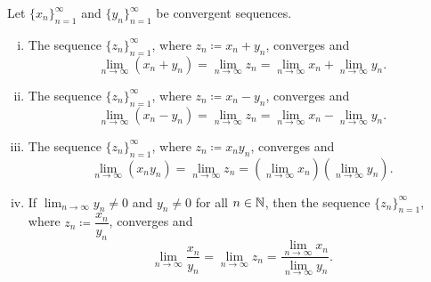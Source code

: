 \begin{prop} \label{prop:contalg}
Let $\{ x_n \}_{n=1}^\infty$ and $\{ y_n \}_{n=1}^\infty$ be convergent sequences.
\begin{enumerate}[(i)]
\item \label{prop:contalg:i}
The sequence $\{ z_n \}_{n=1}^\infty$, where $z_n \coloneqq x_n + y_n$, converges and
\begin{equation*}
\lim_{n \to \infty} (x_n + y_n) = 
\lim_{n \to \infty} z_n = 
\lim_{n \to \infty} x_n + 
\lim_{n \to \infty} y_n .
\end{equation*}
\item \label{prop:contalg:ii}
The sequence $\{ z_n \}_{n=1}^\infty$, where $z_n \coloneqq x_n - y_n$, converges and
\begin{equation*}
\lim_{n \to \infty} (x_n - y_n) = 
\lim_{n \to \infty} z_n = 
\lim_{n \to \infty} x_n - 
\lim_{n \to \infty} y_n .
\end{equation*}
\item \label{prop:contalg:iii}
The sequence $\{ z_n \}_{n=1}^\infty$, where $z_n \coloneqq x_n y_n$, converges and
\begin{equation*}
\lim_{n \to \infty} (x_n y_n) = 
\lim_{n \to \infty} z_n = 
\left( \lim_{n \to \infty} x_n \right)
\left( \lim_{n \to \infty} y_n \right) .
\end{equation*}
\item \label{prop:contalg:iv}
If $\lim_{n\to\infty} y_n \not= 0$ and $y_n \not= 0$ for all $n \in {\mathbb{N}}$, then
the sequence $\{ z_n \}_{n=1}^\infty$, where $z_n \coloneqq \dfrac{x_n}{y_n}$, converges and
\begin{equation*}
\lim_{n \to \infty} \frac{x_n}{y_n} = 
\lim_{n \to \infty} z_n = 
\frac{\lim_{n \to \infty} x_n}{\lim_{n \to \infty} y_n} .
\end{equation*}
\end{enumerate}
\end{prop}

